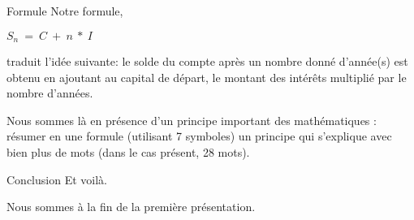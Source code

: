 \documentclass{beamer}
\begin{document}
\begin{frame}{Formule}
  Notre formule,
  \begin{center}
    \begin{math}
    S_{n}\ =\ C\ +\ n\ *\ I
    \end{math}
  \end{center}
  
  traduit l'idée suivante: le solde du compte après un nombre donné d'année(s) est obtenu en ajoutant au capital de départ, le montant des intérêts multiplié par le nombre d'années.

  Nous sommes là en présence d'un principe important des mathématiques : résumer en une formule (utilisant 7 symboles) un principe qui s'explique avec bien plus de mots (dans le cas présent, 28 mots).
\end{frame}

\begin{frame}{Conclusion}
  Et voilà.
  
  Nous sommes à la fin de la première présentation.
\end{frame}
\end{document}
